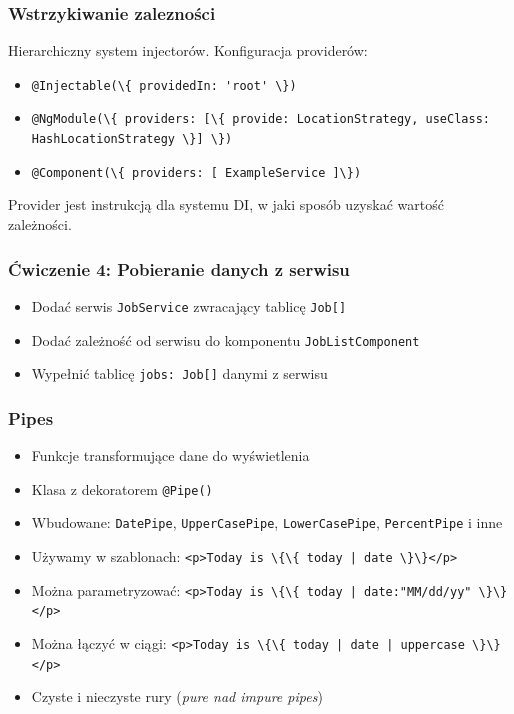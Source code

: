 \documentclass{beamer}
\begin{document}
\begin{frame}
    \frametitle{Wstrzykiwanie zalezności}
    Hierarchiczny system injectorów. Konfiguracja providerów:
    \begin{itemize}
        \item \lstinline|@Injectable(\{ providedIn: 'root' \})|
        \item \lstinline|@NgModule(\{ providers: [\{ provide: LocationStrategy, useClass: HashLocationStrategy \}] \})|
        \item \lstinline|@Component(\{ providers: [ ExampleService ]\})|
    \end{itemize}
    Provider jest instrukcją dla systemu DI, w jaki sposób uzyskać wartość zależności.
\end{frame}

\begin{frame}
    \frametitle{Ćwiczenie 4: Pobieranie danych z serwisu}
    \begin{itemize}
        \item Dodać serwis \lstinline{JobService} zwracający tablicę \lstinline{Job[]}
        \item Dodać zależność od serwisu do komponentu \lstinline{JobListComponent}
        \item Wypełnić tablicę \lstinline{jobs: Job[]} danymi z serwisu
    \end{itemize}
\end{frame}

\begin{frame}
    \frametitle{Pipes}
    \begin{itemize}
        \item Funkcje transformujące dane do wyświetlenia
        \item Klasa z dekoratorem \lstinline{@Pipe()}
        \item Wbudowane: \lstinline{DatePipe}, \lstinline{UpperCasePipe}, \lstinline{LowerCasePipe}, \lstinline{PercentPipe} i inne
        \item Używamy w szablonach: \lstinline!<p>Today is \{\{ today | date \}\}</p>!
        \item Można parametryzować: \lstinline!<p>Today is \{\{ today | date:"MM/dd/yy" \}\}</p>!
        \item Można łączyć w ciągi: \lstinline!<p>Today is \{\{ today | date | uppercase \}\}</p>!
        \item Czyste i nieczyste rury (\textit{pure nad impure pipes})
    \end{itemize}
\end{frame}
\end{document}
